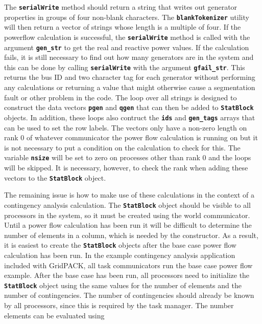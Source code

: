 The \texttt{\textbf{serialWrite}} method should return a string that writes out generator properties in groups of four non-blank characters. The \texttt{\textbf{blankTokenizer}} utility will then return a vector of strings whose length is a multiple of four. If the powerflow calculation is successful, the \texttt{\textbf{serialWrite}} method is called with the argument \texttt{\textbf{gen\_str}} to get the real and reactive power values. If the calculation fails, it is still necessary to find out how many generators are in the system and this can be done by calling \texttt{\textbf{serialWrite}} with the argument \texttt{\textbf{gfail\_str}}. This returns the bus ID and two character tag for each generator without performing any calculations or returning a value that might otherwise cause a segmentation fault or other problem in the code. The loop over all strings is designed to construct the data vectors \texttt{\textbf{pgen}} and \texttt{\textbf{qgen}} that can then be added to \texttt{\textbf{StatBlock}} objects. In addition, these loops also contruct the \texttt{\textbf{ids}} and \texttt{\textbf{gen\_tags}} arrays that can be used to set the row labels. The vectors only have a non-zero length on rank 0 of whatever communicator the power flow calculation is running on but it is not necessary to put a condition on the calculation to check for this. The variable \texttt{\textbf{nsize}} will be set to zero on processes other than rank 0 and the loops will be skipped. It is necessary, however, to check the rank when adding these vectors to the \texttt{\textbf{StatBlock}} object.

The remaining issue is how to make use of these calculations in the context of a contingency analysis calculation. The \texttt{\textbf{StatBlock}} object should be visible to all processors in the system, so it must be created using the world communicator. Until a power flow calculation has been run it will be difficult to determine the number of elements in a column, which is needed by the constructor. As a result, it is easiest to create the \texttt{\textbf{StatBlock}} objects after the base case power flow calculation has been run. In the example contingency analysis application included with GridPACK, all task communicators run the base case power flow example. After the base case has been run, all processors need to initialize the \texttt{\textbf{StatBlock}} object using the same values for the number of elements and the number of contingencies. The number of contingencies should already be known by all processors, since this is required by the task manager. The number elements can be evaluated using

